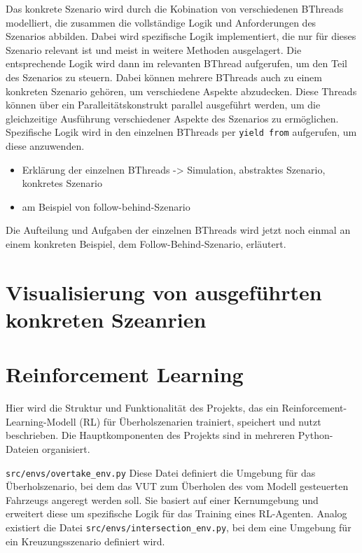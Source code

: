 Das konkrete Szenario wird durch die Kobination von verschiedenen BThreads modelliert, die zusammen die vollständige Logik und Anforderungen des Szenarios abbilden. Dabei wird spezifische Logik implementiert, die nur für dieses Szenario relevant ist und meist in weitere Methoden ausgelagert.
Die entsprechende Logik wird dann im relevanten BThread aufgerufen, um den Teil des Szenarios zu steuern. Dabei können mehrere BThreads auch zu einem konkreten Szenario gehören, um verschiedene Aspekte abzudecken.
Diese Threads können über ein Paralleitätskonstrukt parallel ausgeführt werden, um die gleichzeitige Ausführung verschiedener Aspekte des Szenarios zu ermöglichen. Spezifische Logik wird in den einzelnen BThreads per \texttt{yield from} aufgerufen, um diese anzuwenden.
\begin{itemize}
    \item Erklärung der einzelnen BThreads -> Simulation, abstraktes Szenario, konkretes Szenario
    \item am Beispiel von follow-behind-Szenario
\end{itemize}

Die Aufteilung und Aufgaben der einzelnen BThreads wird jetzt noch einmal an einem konkreten Beispiel, dem Follow-Behind-Szenario, erläutert.

\section{Visualisierung von ausgeführten konkreten Szeanrien}
\section{Reinforcement Learning}
Hier wird die Struktur und Funktionalität des Projekts, das ein Reinforcement-Learning-Modell (RL) für Überholszenarien trainiert, speichert und nutzt beschrieben. Die Hauptkomponenten des Projekts sind in mehreren Python-Dateien organisiert.

\texttt{src/envs/overtake\_env.py}
Diese Datei definiert die Umgebung für das Überholszenario, bei dem das VUT zum Überholen des vom Modell gesteuerten Fahrzeugs angeregt werden soll. Sie basiert auf einer Kernumgebung und erweitert diese um spezifische Logik für das Training eines RL-Agenten.
Analog existiert die Datei \texttt{src/envs/intersection\_env.py}, bei dem eine Umgebung für ein Kreuzungsszenario definiert wird.

